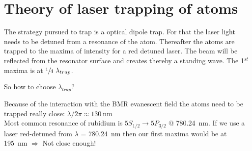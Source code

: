 
\chapter{\label{chap:dipole}Theory of laser trapping of atoms}


\ifpdf{}
    \graphicspath{{Chapter1/Figs/Raster/}{Chapter1/Figs/PDF/}{Chapter1/Figs/}}
\else
    \graphicspath{{Chapter1/Figs/Vector/}{Chapter1/Figs/}}
\fi

The strategy pursued to trap is a optical dipole trap. For that the laser light 
needs to be detuned from a resonance of the atom. Thereafter the atoms are trapped
to the maxima of intensity for a red detuned laser. The beam will be reflected 
from the resonator surface and creates thereby a standing wave. The 1\(^{st}\)
maxima is at \(\sfrac{1}{4}~\lambda_{trap} \).
\bigskip

So how to choose \(\lambda_{trap}\)?
\bigskip

Because of the interaction with the BMR evanescent field the atoms need to
be trapped really close: \(\lambda / 2\pi \approx \SI{130}{\nano\meter} \) \\
Most common resonance of rubidium is \(5S_{1/2} \rightarrow 5P_{3/2}\) @
\SI{780.24}{\nano\meter}. If we use a laser red-detuned from \(\lambda \) = 
\SI{780.24}{\nano\meter} then our first maxima would be at \SI{195}{\nano\meter}
\(\Rightarrow \) Not close enough!
\bigskip

